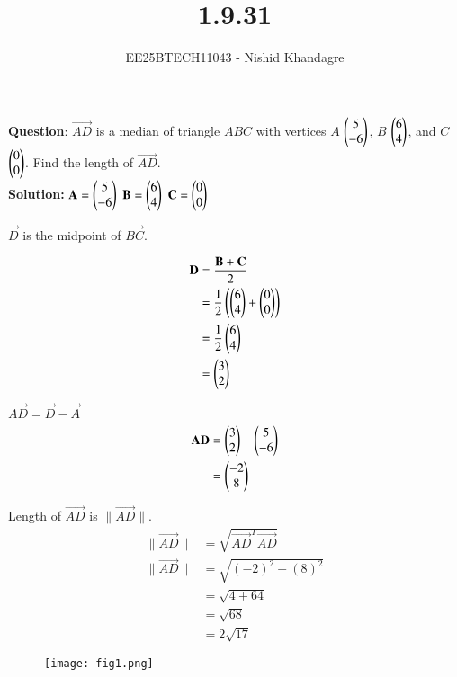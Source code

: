 \documentclass[journal]{IEEEtran}
\title{1.9.31}
\author{EE25BTECH11043 - Nishid Khandagre} %
\begin{document}
\maketitle

\renewcommand{\thefigure}{\theenumi}
\renewcommand{\thetable}{\theenumi}


\textbf{Question}:
$\vec{AD}$ is a median of triangle $ABC$ with vertices $A$ $\begin{pmatrix} 5\\-6\end{pmatrix}$, $B$ $\begin{pmatrix} 6\\4 \end{pmatrix}$, and $C$ $\begin{pmatrix} 0\\0 \end{pmatrix}$. Find the length of $\vec{AD}$.
\\

\textbf{Solution: }
$\mathbf{A} = \begin{pmatrix} 5 \\ -6 \end{pmatrix}$
$\mathbf{B} = \begin{pmatrix} 6 \\ 4 \end{pmatrix}$
$\mathbf{C} = \begin{pmatrix} 0 \\ 0 \end{pmatrix}$

$\vec{D}$ is the midpoint of $\vec{BC}$.

\begin{align}
\mathbf{D} &= \frac{\mathbf{B} + \mathbf{C}}{2} \\
&= \frac{1}{2}\left(\begin{pmatrix}6 \\ 4\end{pmatrix} + \begin{pmatrix}0 \\ 0\end{pmatrix}\right) \\
&= \frac{1}{2}\begin{pmatrix}6 \\ 4\end{pmatrix} \\
&= \begin{pmatrix}3 \\ 2\end{pmatrix}
\end{align}

$\vec{AD} = \vec{D} - \vec{A}$
\begin{align}
\mathbf{AD} &= \begin{pmatrix}3 \\ 2\end{pmatrix} - \begin{pmatrix}5 \\ -6\end{pmatrix} \\
&= \begin{pmatrix}-2 \\ 8\end{pmatrix}
\end{align}

Length of $\vec{AD}$ is $\|\vec{AD}\|$.
\begin{align}
\|\vec{AD}\| &= \sqrt{\vec{AD}^T\vec{AD}}\\
\|\vec{AD}\| &= \sqrt{(-2)^2 + (8)^2} \\
&= \sqrt{4 + 64} \\
&= \sqrt{68} \\
&= 2\sqrt{17}
\end{align}

\begin{figure}[H]
   \centering
  \texttt{[image: fig1.png]}
   \caption{}
   \label{fig:1}
\end{figure}
\end{document}
